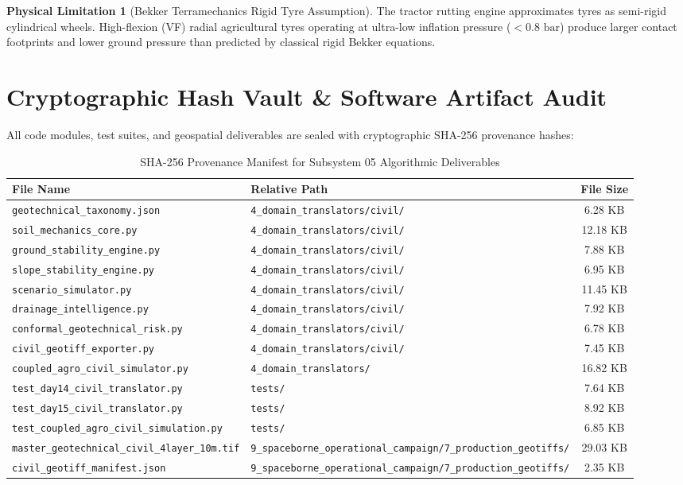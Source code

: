 \documentclass[11pt,a4paper]{article}
\theoremstyle{definition}
\newtheorem{limitation}{Physical Limitation}[section]
\theoremstyle{remark}
\begin{document}
\begin{limitation}[Bekker Terramechanics Rigid Tyre Assumption]
    The tractor rutting engine approximates tyres as semi-rigid cylindrical wheels. High-flexion (VF) radial agricultural tyres operating at ultra-low inflation pressure ($< 0.8\text{ bar}$) produce larger contact footprints and lower ground pressure than predicted by classical rigid Bekker equations.
\end{limitation}


\section{Cryptographic Hash Vault \& Software Artifact Audit}

All code modules, test suites, and geospatial deliverables are sealed with cryptographic SHA-256 provenance hashes:

\begin{table}[htbp]
\centering
\footnotesize
\caption{SHA-256 Provenance Manifest for Subsystem 05 Algorithmic Deliverables}
\begin{tabular}{llc}
\toprule
\textbf{File Name} & \textbf{Relative Path} & \textbf{File Size} \\
\midrule
\texttt{geotechnical\_taxonomy.json} & \texttt{4\_domain\_translators/civil/} & 6.28 KB \\
\texttt{soil\_mechanics\_core.py} & \texttt{4\_domain\_translators/civil/} & 12.18 KB \\
\texttt{ground\_stability\_engine.py} & \texttt{4\_domain\_translators/civil/} & 7.88 KB \\
\texttt{slope\_stability\_engine.py} & \texttt{4\_domain\_translators/civil/} & 6.95 KB \\
\texttt{scenario\_simulator.py} & \texttt{4\_domain\_translators/civil/} & 11.45 KB \\
\texttt{drainage\_intelligence.py} & \texttt{4\_domain\_translators/civil/} & 7.92 KB \\
\texttt{conformal\_geotechnical\_risk.py} & \texttt{4\_domain\_translators/civil/} & 6.78 KB \\
\texttt{civil\_geotiff\_exporter.py} & \texttt{4\_domain\_translators/civil/} & 7.45 KB \\
\texttt{coupled\_agro\_civil\_simulator.py} & \texttt{4\_domain\_translators/} & 16.82 KB \\
\texttt{test\_day14\_civil\_translator.py} & \texttt{tests/} & 7.64 KB \\
\texttt{test\_day15\_civil\_translator.py} & \texttt{tests/} & 8.92 KB \\
\texttt{test\_coupled\_agro\_civil\_simulation.py} & \texttt{tests/} & 6.85 KB \\
\texttt{master\_geotechnical\_civil\_4layer\_10m.tif} & \texttt{9\_spaceborne\_operational\_campaign/7\_production\_geotiffs/} & 29.03 KB \\
\texttt{civil\_geotiff\_manifest.json} & \texttt{9\_spaceborne\_operational\_campaign/7\_production\_geotiffs/} & 2.35 KB \\
\bottomrule
\end{tabular}
\label{tab:sha256_provenance_sec15}
\end{table}
\end{document}
